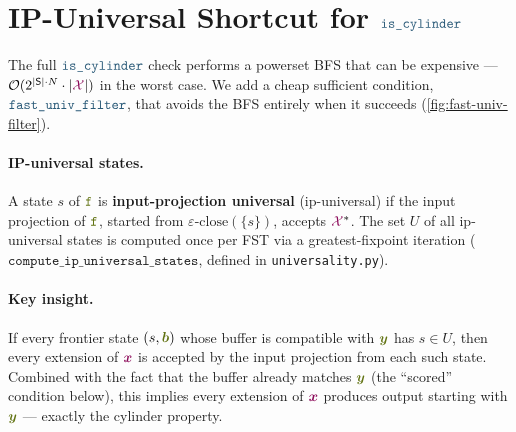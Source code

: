 \documentclass{article}
\theoremstyle{plain}
\newcommand{\mymacro}[1]{#1}
\newcommand{\defn}[1]{\textbf{#1}}
\newcommand{\kleene}[1]{#1^*}
\newcommand{\srcStr}{\ensuremath{{\color{TokenColor}\boldsymbol{x}}}\xspace}
\newcommand{\tgtStr}{{\color{CharacterColor}\boldsymbol{y}}}
\newcommand{\srcAlphabet}[0]{{\color{TokenColor}\ensuremath{\mathcal{X}}}\xspace}
\newcommand{\transST}{{\color{CharacterColor}\texttt{f}}}
\newcommand{\States}{\mymacro{\mathsf{S}}}
\newcommand{\state}{\mymacro{s}}
\newcommand{\buffer}{{\color{CharacterColor}\boldsymbol{b}}}
\newcommand{\myMintedFunc}[1]{\mbox{\texttt{{\color{StormBlue}#1}}}}
\newcommand{\continuous}[0]{\myMintedFunc{is\_cylinder}}
\newcommand{\ipUniversal}[0]{\myMintedFunc{fast\_univ\_filter}}
\newcommand{\ipUniversalStates}[0]{U}
\begin{document}
\section{IP-Universal Shortcut for \texorpdfstring{$\continuous$}{is\_cylinder}}
\label{sec:fast-univ-filter}

The full $\continuous$ check performs a powerset BFS that can be expensive ---
$\mathcal{O}(2^{|\States| \cdot N} \cdot |\srcAlphabet|)$ in the worst case.
We add a cheap sufficient condition, $\ipUniversal$, that avoids the BFS
entirely when it succeeds (\cref{fig:fast-univ-filter}).

\paragraph{IP-universal states.}
A state $\state$ of $\transST$ is \defn{input-projection universal} (ip-universal)
if the input projection of $\transST$, started from
$\varepsilon\text{-close}(\{\state\})$, accepts $\kleene{\srcAlphabet}$.
The set $\ipUniversalStates$ of all ip-universal states is computed once per FST
via a greatest-fixpoint iteration
($\texttt{compute\_ip\_universal\_states}$, defined in
\texttt{universality.py}).

\paragraph{Key insight.}
If every frontier state $(\state, \buffer)$ whose buffer is compatible with
$\tgtStr$ has $\state \in \ipUniversalStates$, then every extension of $\srcStr$
is accepted by the input projection from each such state.
Combined with the fact that the buffer already matches $\tgtStr$
(the ``scored'' condition below), this implies every extension of $\srcStr$
produces output starting with $\tgtStr$ --- exactly the cylinder property.
\end{document}
